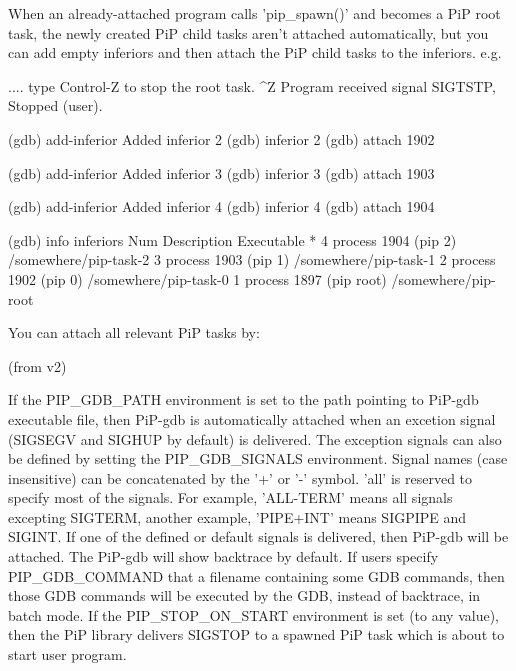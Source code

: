 \documentclass[twoside]{book}
\begin{document}
When an already-\/attached program calls 'pip\-\_\-spawn()' and becomes a Pi\-P root task, the newly created Pi\-P child tasks aren't attached automatically, but you can add empty inferiors and then attach the Pi\-P child tasks to the inferiors. e.\-g. \begin{DoxyVerb}.... type Control-Z to stop the root task.
^Z
Program received signal SIGTSTP, Stopped (user).

(gdb) add-inferior
Added inferior 2
(gdb) inferior 2
(gdb) attach 1902

(gdb) add-inferior
Added inferior 3
(gdb) inferior 3
(gdb) attach 1903

(gdb) add-inferior
Added inferior 4
(gdb) inferior 4
(gdb) attach 1904

(gdb) info inferiors
  Num  Description              Executable
* 4    process 1904 (pip 2)     /somewhere/pip-task-2
  3    process 1903 (pip 1)     /somewhere/pip-task-1
  2    process 1902 (pip 0)     /somewhere/pip-task-0
  1    process 1897 (pip root)  /somewhere/pip-root
\end{DoxyVerb}


You can attach all relevant Pi\-P tasks by\-: 


(from v2)

If the P\-I\-P\-\_\-\-G\-D\-B\-\_\-\-P\-A\-T\-H environment is set to the path pointing to Pi\-P-\/gdb executable file, then Pi\-P-\/gdb is automatically attached when an excetion signal (S\-I\-G\-S\-E\-G\-V and S\-I\-G\-H\-U\-P by default) is delivered. The exception signals can also be defined by setting the P\-I\-P\-\_\-\-G\-D\-B\-\_\-\-S\-I\-G\-N\-A\-L\-S environment. Signal names (case insensitive) can be concatenated by the '+' or '-\/' symbol. 'all' is reserved to specify most of the signals. For example, 'A\-L\-L-\/\-T\-E\-R\-M' means all signals excepting S\-I\-G\-T\-E\-R\-M, another example, 'P\-I\-P\-E+\-I\-N\-T' means S\-I\-G\-P\-I\-P\-E and S\-I\-G\-I\-N\-T. If one of the defined or default signals is delivered, then Pi\-P-\/gdb will be attached. The Pi\-P-\/gdb will show backtrace by default. If users specify P\-I\-P\-\_\-\-G\-D\-B\-\_\-\-C\-O\-M\-M\-A\-N\-D that a filename containing some G\-D\-B commands, then those G\-D\-B commands will be executed by the G\-D\-B, instead of backtrace, in batch mode. If the P\-I\-P\-\_\-\-S\-T\-O\-P\-\_\-\-O\-N\-\_\-\-S\-T\-A\-R\-T environment is set (to any value), then the Pi\-P library delivers S\-I\-G\-S\-T\-O\-P to a spawned Pi\-P task which is about to start user program.
\end{document}
